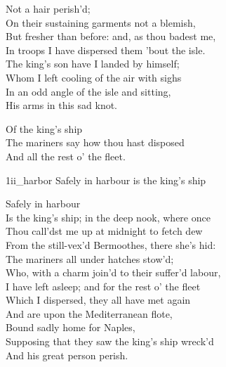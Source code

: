 \begin{verse_speech}[Ariel] 
Not a hair perish'd;\\
On their sustaining garments not a blemish,\\
But fresher than before: and, as thou badest me,\\
In troops I have dispersed them 'bout the isle.\\
The king's son have I landed by himself;\\
Whom I left cooling of the air with sighs\\
In an odd angle of the isle and sitting,\\
His arms in this sad knot.
\end{verse_speech}

\begin{verse_speech}[Prospero] 
Of the king's ship\\
The mariners say how thou hast disposed\\
And all the rest o' the fleet.
\end{verse_speech}



\begin{pictures} %
	\begin{a4}
		\begin{colorbigpic}
			[1]
			{1ii_harbor}
			{Safely in harbour is the king's ship}
		\end{colorbigpic}
	\end{a4}
\end{pictures}
	



\begin{verse_speech}[Ariel] 
Safely in harbour\\
Is the king's ship; in the deep nook, where once\\
Thou call'dst me up at midnight to fetch dew\\
From the still-vex'd Bermoothes, there she's hid:\\
The mariners all under hatches stow'd;\\
Who, with a charm join'd to their suffer'd labour,\\
I have left asleep; and for the rest o' the fleet\\
Which I dispersed, they all have met again\\
And are upon the Mediterranean flote,\\
Bound sadly home for Naples,\\
Supposing that they saw the king's ship wreck'd\\
And his great person perish.
\end{verse_speech}

